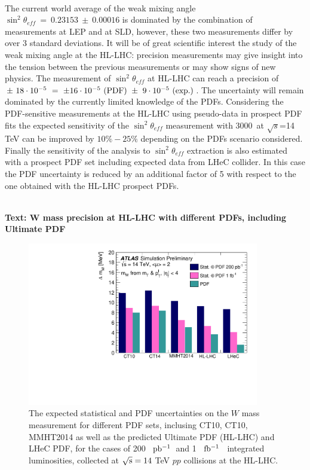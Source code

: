 \documentclass{article}
\newcommand*{\fbinv}{\ensuremath{{\rm fb^{-1}}}\xspace}
\newcommand*{\pbinv}{\ensuremath{{\rm pb^{-1}}}\xspace}
\begin{document}
\\

The current world average of the weak mixing angle $\sin^2\theta_{eff}~=~0.23153~\pm~0.00016$ is dominated by the combination of measurements at LEP and at SLD, however, these two measurements differ by over 3 standard deviations. It will be of great scientific interest the study of the weak mixing angle at the HL-LHC: precision measurements may give insight into the tension between the previous measurements or may show signs of new physics. The measurement of $\sin^2\theta_{eff}$ at HL-LHC can reach a precision of $\pm~ 18 \cdot 10^{-5} ~= ~\pm 16 \cdot 10^{-5} ~({\rm PDF}) ~\pm~ 9 \cdot 10^{-5} ~({\rm exp.})$. The uncertainty will remain dominated by the currently limited knowledge of the PDFs. Considering the PDF-sensitive measurements at the HL-LHC using pseudo-data in prospect PDF fits the expected sensitivity of the
$\sin^2\theta_{eff}$ measurement with 3000~\ifb at
$\sqrt{s}$=14 TeV can be improved by $10\% - 25\%$ depending on the PDFs scenario considered.
Finally the sensitivity of the analysis to $\sin^2\theta_{eff}$ extraction is also estimated with a prospect PDF set including expected data from LHeC collider. In this case the PDF uncertainty is reduced by an additional factor of 5 with respect to the one obtained with the HL-LHC prospect PDFs.

\\
{\bf Text: W mass precision at HL-LHC with different PDFs, including Ultimate PDF}


\begin{figure}
\centering
\includegraphics[width=0.9\textwidth]{Wmass_fig_06.pdf}
\caption{\label{Fig:Wmass} The expected statistical and PDF uncertainties on the $W$ mass measurement for different PDF sets, inclusing CT10, CT10, MMHT2014 as well as the predicted Ultimate PDF (HL-LHC) and LHeC PDF,  for the cases of 200 ~\pbinv ~and 1 ~\fbinv~  integrated luminosities, collected at ${\rm \sqrt{s}=14}$ TeV $pp$ collisions at the HL-LHC.}
\end{figure}
\end{document}
